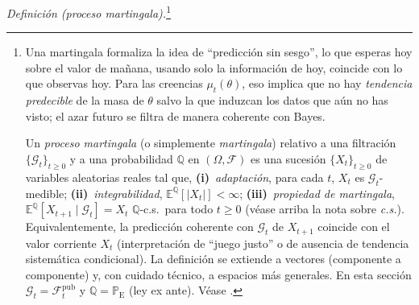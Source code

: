 \documentclass[12pt]{article}
\providecommand{\textcite}{\citet}
\theoremstyle{definition}
\theoremstyle{remark}
\newcommand{\E}{\mathbb{E}}
\newcommand{\ProbE}{\mathbb{P}_{\mathrm{E}}}
\newcommand{\1}{\mathbf{1}}
\begin{document}
\noindent\textit{Definición \textup{(}proceso martingala\textup{)}.}\footnote{%
Una martingala formaliza la idea de ``predicción sin sesgo'', lo que esperas hoy sobre el valor de mañana, usando solo la información de hoy, coincide con lo que observas hoy. Para las creencias $\mu_t(\theta)$, eso implica que no hay \emph{tendencia predecible} de la masa de $\theta$ salvo la que induzcan los datos que aún no has visto; el azar futuro se filtra de manera coherente con Bayes.
\par\smallskip
Un \emph{proceso martingala} \textup{(}o simplemente \emph{martingala}\textup{)} relativo a una filtración $\{\mathcal{G}_t\}_{t\ge 0}$ y a una probabilidad $\mathbb{Q}$ en $(\Omega,\mathcal{F})$ es una sucesión $\{X_t\}_{t\ge 0}$ de variables aleatorias reales tal que, \textbf{\textup{(i)}}~\emph{adaptación}, para cada $t$, $X_t$ es $\mathcal{G}_t$-medible; \textbf{\textup{(ii)}}~\emph{integrabilidad}, $\E^{\mathbb{Q}}[\lvert X_t\rvert]<\infty$; \textbf{\textup{(iii)}}~\emph{propiedad de martingala}, $\E^{\mathbb{Q}}[X_{t+1}\mid\mathcal{G}_t]=X_t$ $\mathbb{Q}$-c.s.\ para todo $t\ge 0$ \textup{(}véase arriba la nota sobre \emph{c.s.}\textup{)}. Equivalentemente, la predicción coherente con $\mathcal{G}_t$ de $X_{t+1}$ coincide con el valor corriente $X_t$ \textup{(}interpretación de ``juego justo'' o de ausencia de tendencia sistemática condicional\textup{)}. La definición se extiende a vectores \textup{(}componente a componente\textup{)} y, con cuidado técnico, a espacios más generales. En esta sección $\mathcal{G}_t=\mathcal{F}_t^{\mathrm{pub}}$ y $\mathbb{Q}=\ProbE$ \textup{(}ley ex ante\textup{)}. Véase \textcite{Williams1991Martingales}.%
}
\end{document}
